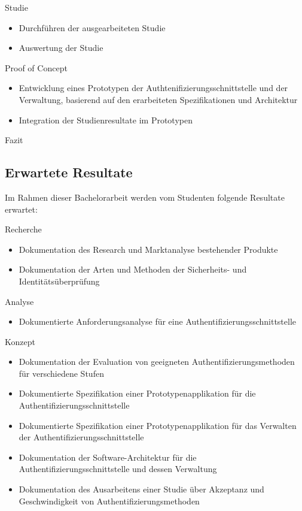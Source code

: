 \newpage

Studie

\begin{itemize}
\tightlist
\item
  Durchführen der ausgearbeiteten Studie
\item
  Auswertung der Studie
\end{itemize}

Proof of Concept

\begin{itemize}
\tightlist
\item
  Entwicklung eines Prototypen der Authtenifizierungsschnittstelle und
  der Verwaltung, basierend auf den erarbeiteten Spezifikationen und
  Architektur
\item
  Integration der Studienresultate im Prototypen
\end{itemize}

Fazit

\subsection{Erwartete Resultate}\label{erwartete-resultate}

Im Rahmen dieser Bachelorarbeit werden vom Studenten folgende Resultate
erwartet:

Recherche

\begin{itemize}
\tightlist
\item
  Dokumentation des Research und Marktanalyse bestehender Produkte
\item
  Dokumentation der Arten und Methoden der Sicherheits- und
  Identitätsüberprüfung
\end{itemize}

Analyse

\begin{itemize}
\tightlist
\item
  Dokumentierte Anforderungsanalyse für eine
  Authentifizierungsschnittstelle
\end{itemize}

Konzept

\begin{itemize}
\tightlist
\item
  Dokumentation der Evaluation von geeigneten Authentifizierungsmethoden
  für verschiedene Stufen
\item
  Dokumentierte Spezifikation einer Prototypenapplikation für die
  Authentifizierungsschnittstelle
\item
  Dokumentierte Spezifikation einer Prototypenapplikation für das
  Verwalten der Authentifizierungsschnittstelle
\item
  Dokumentation der Software-Architektur für die
  Authentifizierungsschnittstelle und dessen Verwaltung
\item
  Dokumentation des Ausarbeitens einer Studie über Akzeptanz und
  Geschwindigkeit von Authentifizierungsmethoden
\end{itemize}

